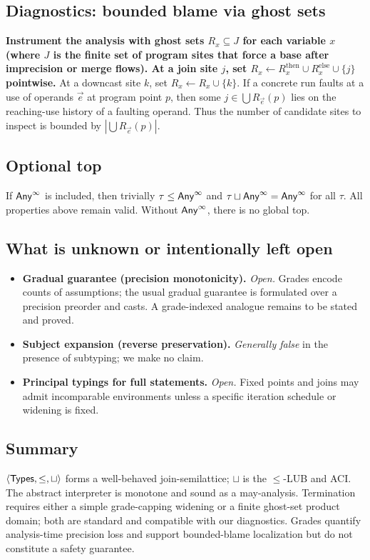 \subsection{Diagnostics: bounded blame via ghost sets}

\textbf{Instrument the analysis with ghost sets $R_x\subseteq J$ for each variable $x$ (where $J$ is the finite set of program sites that force a base after imprecision or merge flows).
At a join site $j$, set $R_x \leftarrow R_x^{\mathrm{then}}\cup R_x^{\mathrm{else}}\cup\{j\}$ pointwise.}
At a downcast site $k$, set $R_x \leftarrow R_x\cup\{k\}$.
If a concrete run faults at a use of operands $\vec{e}$ at program point $p$, then some $j\in \bigcup R_{\vec{e}}(p)$ lies on the reaching-use history of a faulting operand.
Thus the number of candidate sites to inspect is bounded by $|\bigcup R_{\vec{e}}(p)|$.

\subsection{Optional top}
If $\mathsf{Any}^{\infty}$ is included, then trivially $\tau\le \mathsf{Any}^{\infty}$ and $\tau\sqcup \mathsf{Any}^{\infty}=\mathsf{Any}^{\infty}$ for all $\tau$.
All properties above remain valid.
Without $\mathsf{Any}^{\infty}$, there is no global top.

\subsection{What is unknown or intentionally left open}
\begin{itemize}
\item \textbf{Gradual guarantee (precision monotonicity).} \emph{Open.}
Grades encode counts of assumptions; the usual gradual guarantee is formulated over a precision preorder and casts. A grade-indexed analogue remains to be stated and proved.
\item \textbf{Subject expansion (reverse preservation).} \emph{Generally false} in the presence of subtyping; we make no claim.
\item \textbf{Principal typings for full statements.} \emph{Open.} Fixed points and joins may admit incomparable environments unless a specific iteration schedule or widening is fixed.
\end{itemize}

\subsection{Summary}
$\langle\mathsf{Types},\le,\sqcup\rangle$ forms a well-behaved join-semilattice; $\sqcup$ is the $\le$-LUB and ACI.
The abstract interpreter is monotone and sound as a may-analysis.
Termination requires either a simple grade-capping widening or a finite ghost-set product domain; both are standard and compatible with our diagnostics.
Grades quantify analysis-time precision loss and support bounded-blame localization but do not constitute a safety guarantee.
